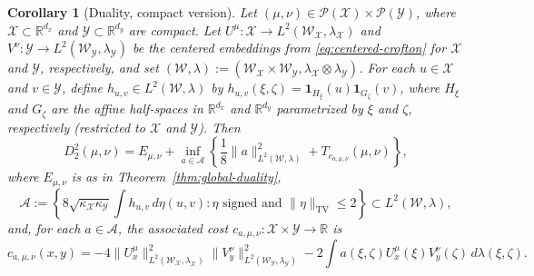 \documentclass[11pt]{amsart}
\newtheorem{corollary}[theorem]{Corollary}
\theoremstyle{definition}
\theoremstyle{remark}
\newcommand{\1}{\mathbf{1}}
\numberwithin{equation}{section}
\newcommand{\TV}{\mathrm{TV}}
\begin{document}
\begin{corollary}[Duality, compact version]\label{cor:compact-duality}
Let $(\mu, \nu) \in \mathcal{P}(\mathcal{X})\times \mathcal{P}(\mathcal{Y})$,
where $\mathcal{X} \subset \mathbb{R}^{d_x}$ and
$\mathcal{Y} \subset \mathbb{R}^{d_y}$ are compact. Let
$U^\mu \colon \mathcal{X} \to L^2(\mathcal W_\mathcal{X}, \lambda_\mathcal{X})$ and
$V^\nu \colon \mathcal{Y} \to L^2(\mathcal W_\mathcal{Y}, \lambda_\mathcal{Y})$ be the
centered embeddings from \eqref{eq:centered-crofton} for $\mathcal{X}$ and
$\mathcal{Y}$, respectively, and set
$(\mathcal W, \lambda) := (\mathcal W_\mathcal{X} \times \mathcal W_\mathcal{Y},
\lambda_\mathcal{X} \otimes \lambda_\mathcal{Y})$. For each
$u \in \mathcal{X}$ and $v \in \mathcal{Y}$, define
$h_{u,v} \in L^2(\mathcal W, \lambda)$ by
$h_{u,v}(\xi, \zeta) = \mathbf{1}_{H_\xi}(u)\mathbf{1}_{G_\zeta}(v)$, where
$H_\xi$ and $G_\zeta$ are the affine half-spaces in $\mathbb{R}^{d_x}$ and
$\mathbb{R}^{d_y}$ parametrized by $\xi$ and $\zeta$, respectively (restricted to $\mathcal X$ and $\mathcal{Y}$). Then
\begin{equation}\label{eq:21dual}
D_2^2(\mu, \nu)
= E_{\mu,\nu}
+ \inf_{a \in \mathcal{A}}
\left\{ \frac{1}{8}\|a\|_{L^2(\mathcal W,\lambda)}^2 + T_{c_{a,\mu,\nu}}(\mu, \nu) \right\},
\end{equation}
where $E_{\mu,\nu}$ is as in Theorem~\ref{thm:global-duality},
\begin{equation*}
\mathcal{A} := \left\{ 8\sqrt{\kappa_\mathcal{X}\kappa_\mathcal{Y}}
\int h_{u,v} \, d\eta(u,v) : \eta \text{ signed and }
\|\eta\|_{\TV} \leq 2 \right\} \subset L^2(\mathcal W, \lambda),
\end{equation*}
and, for each $a \in \mathcal{A}$, the associated cost
$c_{a,\mu,\nu} \colon \mathcal{X} \times \mathcal{Y} \to \mathbb{R}$ is
\begin{equation}\label{eq:cost-original}
c_{a,\mu,\nu}(x, y)
= -4 \|U^\mu_x\|_{L^2(\mathcal W_\mathcal{X},\lambda_\mathcal{X})}^2
\|V^\nu_y\|_{L^2(\mathcal W_\mathcal{Y},\lambda_\mathcal{Y})}^2
- 2 \int a(\xi, \zeta) U^\mu_x(\xi) V^\nu_y(\zeta) \, d\lambda(\xi, \zeta).
\end{equation}
\end{corollary}
\end{document}
